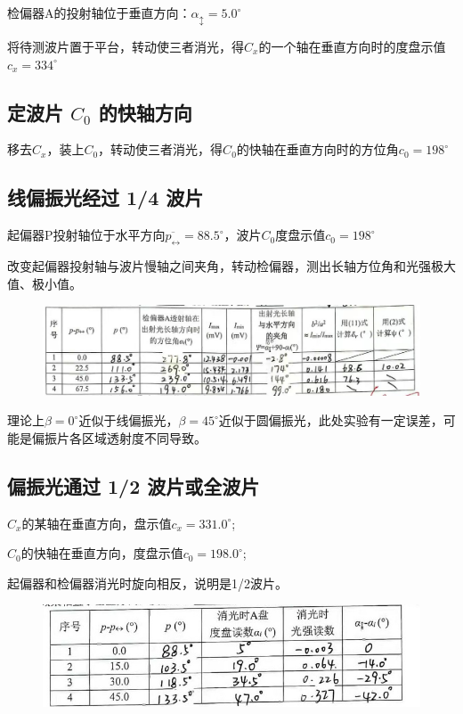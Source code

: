 \documentclass[UTF8]{ctexart}
\begin{document}
检偏器A的投射轴位于垂直方向：$\alpha_{\updownarrow}={5.0}^\circ$

将待测波片置于平台，转动使三者消光，得$C_x$的一个轴在垂直方向时的度盘示值$c_x=334^\circ$



\subsection{定波片 $C_0$ 的快轴方向}
移去$C_x$，装上$C_0$，转动使三者消光，得$C_0$的快轴在垂直方向时的方位角$c_0=198^\circ$



\subsection{ 线偏振光经过 1/4 波片}


起偏器P投射轴位于水平方向$\overline{p_{\leftrightarrow}}=88.5^\circ$，波片$C_0$度盘示值$c_0=198^\circ$

改变起偏器投射轴与波片慢轴之间夹角，转动检偏器，测出长轴方位角和光强极大值、极小值。

\begin{figure}[H]
  \centering
  \includegraphics[scale=0.5]{9.jpg}
\end{figure}

理论上$\beta=0^\circ$近似于线偏振光，$\beta=45^\circ$近似于圆偏振光，此处实验有一定误差，可能是偏振片各区域透射度不同导致。

\subsection{偏振光通过 1/2 波片或全波片}

$C_x$的某轴在垂直方向，盘示值$c_x=331.0^\circ$;

$C_0$的快轴在垂直方向，度盘示值$c_0=198.0^\circ$;

起偏器和检偏器消光时旋向相反，说明是1/2波片。

\begin{figure}[H]
  \centering
  \includegraphics[scale=0.5]{10.jpg}
\end{figure}
\end{document}
